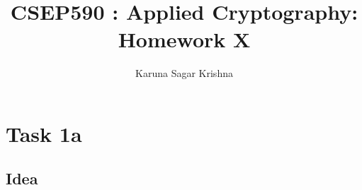 \documentclass{article}
\title{CSEP590 : Applied Cryptography: Homework X}
\author{Karuna Sagar Krishna}
\begin{document}
    \maketitle

    \section*{Task 1a}

    \subsection*{Idea}
\end{document}
